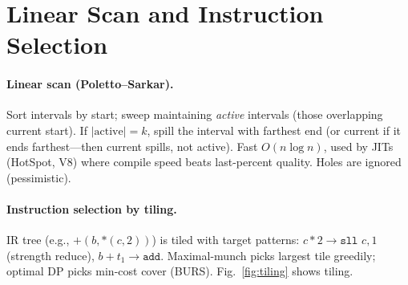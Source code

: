 \section{Linear Scan and Instruction Selection}
\label{sec:linear-scan}
\paragraph{Linear scan (Poletto--Sarkar).} Sort intervals by start; sweep maintaining \emph{active} intervals (those overlapping current start). If $|\text{active}|=k$, spill the interval with farthest end (or current if it ends farthest---then current spills, not active). Fast $O(n\log n)$, used by JITs (HotSpot, V8) where compile speed beats last-percent quality. Holes are ignored (pessimistic).

\paragraph{Instruction selection by tiling.} IR tree (e.g., $+(b,*(c,2))$) is tiled with target patterns: $c*2\to\texttt{sll }c,1$ (strength reduce), $b+t_1\to\texttt{add}$. Maximal-munch picks largest tile greedily; optimal DP picks min-cost cover (BURS). Fig.~\ref{fig:tiling} shows tiling.

